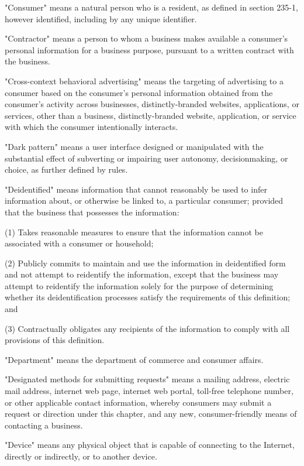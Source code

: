      "Consumer" means a natural person who is a resident, as defined in section 235-1, however identified, including by any unique identifier.

     "Contractor" means a person to whom a business makes available a consumer's personal information for a business purpose, pursuant to a written contract with the business.

     "Cross-context behavioral advertising" means the targeting of advertising to a consumer based on the consumer's personal information obtained from the consumer's activity across businesses, distinctly-branded websites, applications, or services, other than a business, distinctly-branded website, application, or service with which the consumer intentionally interacts.

     "Dark pattern" means a user interface designed or manipulated with the substantial effect of subverting or impairing user autonomy, decisionmaking, or choice, as further defined by rules.

     "Deidentified" means information that cannot reasonably be used to infer information about, or otherwise be linked to, a particular consumer; provided that the business that possesses the information:

     (1)  Takes reasonable measures to ensure that the information cannot be associated with a consumer or household;

     (2)  Publicly commits to maintain and use the information in deidentified form and not attempt to reidentify the information, except that the business may attempt to reidentify the information solely for the purpose of determining whether its deidentification processes satisfy the requirements of this definition; and

     (3)  Contractually obligates any recipients of the information to comply with all provisions of this definition.

     "Department" means the department of commerce and consumer affairs.

     "Designated methods for submitting requests" means a mailing address, electric mail address, internet web page, internet web portal, toll-free telephone number, or other applicable contact information, whereby consumers may submit a request or direction under this chapter, and any new, consumer-friendly means of contacting a business.

     "Device" means any physical object that is capable of connecting to the Internet, directly or indirectly, or to another device.

